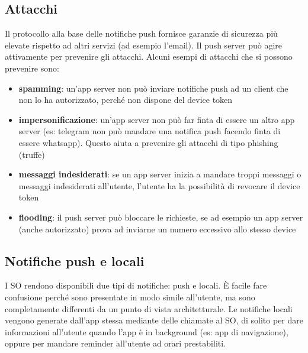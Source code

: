\subsection{Attacchi}
Il protocollo alla base delle notifiche push fornisce garanzie di sicurezza più elevate rispetto ad altri servizi (ad esempio l'email).
Il push server può agire attivamente per prevenire gli attacchi. Alcuni esempi di attacchi che si possono prevenire sono:
\begin{itemize}
    \item \textbf{spamming}: un'app server non può inviare notifiche push ad un client che non lo ha autorizzato, perché non dispone del device token
    \item \textbf{impersonificazione}: un'app server non può far finta di essere un altro app server (es: telegram non può mandare una notifica push facendo finta di essere whatsapp). Questo aiuta a prevenire gli attacchi di tipo phishing (truffe) 
    \item \textbf{messaggi indesiderati}: se un app server inizia a mandare troppi messaggi o messaggi indesiderati all’utente, l’utente ha la possibilità di revocare il device token
    \item \textbf{flooding}: il push server può bloccare le richieste, se ad esempio un app server (anche autorizzato) prova ad inviarne un numero eccessivo allo stesso device
\end{itemize}

\subsection{Notifiche push e locali}
I SO rendono disponibili due tipi di notifiche: push e locali.
È facile fare confusione perché sono presentate in modo simile all'utente, ma sono completamente differenti da un punto di vista architetturale.
Le notifiche locali vengono generate dall'app stessa mediante delle chiamate al SO, di solito per dare informazioni all'utente quando l'app è in background (es: app di navigazione), oppure per mandare reminder all'utente ad orari prestabiliti.

